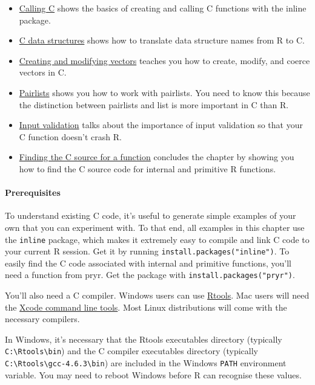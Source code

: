 \begin{itemize}
\item
  \hyperref[calling-c]{Calling C} shows the basics of creating and
  calling C functions with the inline package.
\item
  \hyperref[c-data-structures]{C data structures} shows how to translate
  data structure names from R to C.
\item
  \hyperref[c-vectors]{Creating and modifying vectors} teaches you how
  to create, modify, and coerce vectors in C.
\item
  \hyperref[c-pairlists]{Pairlists} shows you how to work with
  pairlists. You need to know this because the distinction between
  pairlists and list is more important in C than R.
\item
  \hyperref[c-input-validation]{Input validation} talks about the
  importance of input validation so that your C function doesn't crash
  R.
\item
  \hyperref[c-find-source]{Finding the C source for a function}
  concludes the chapter by showing you how to find the C source code for
  internal and primitive R functions.
\end{itemize}

\paragraph{Prerequisites}

To understand existing C code, it's useful to generate simple examples
of your own that you can experiment with. To that end, all examples in
this chapter use the \texttt{inline} package, which makes it extremely
easy to compile and link C code to your current R session. Get it by
running \texttt{install.packages("inline")}. To easily find the C code
associated with internal and primitive functions, you'll need a function
from pryr. Get the package with \texttt{install.packages("pryr")}.

You'll also need a C compiler. Windows users can use
\href{http://cran.r-project.org/bin/windows/Rtools/}{Rtools}. Mac users
will need the \href{http://developer.apple.com/}{Xcode command line
tools}. Most Linux distributions will come with the necessary compilers.

In Windows, it's necessary that the Rtools executables directory
(typically \texttt{C:\textbackslash{}Rtools\textbackslash{}bin}) and the
C compiler executables directory (typically
\texttt{C:\textbackslash{}Rtools\textbackslash{}gcc-4.6.3\textbackslash{}bin})
are included in the Windows \texttt{PATH} environment variable. You may
need to reboot Windows before R can recognise these values.

